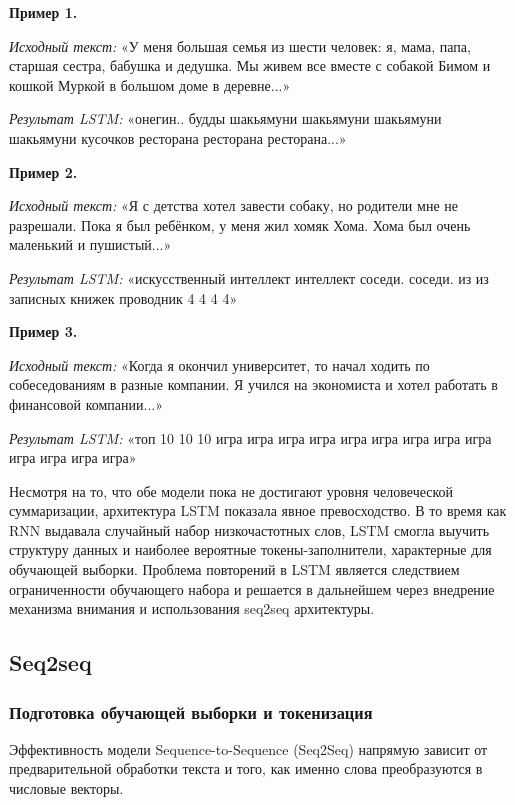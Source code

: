 \documentclass[coursework]{SCWorks}
\begin{document}
    \textbf{Пример 1.}

    \textit{Исходный текст:} «У меня большая семья из шести человек: я, мама, папа, старшая сестра, бабушка и дедушка. Мы живем все вместе с собакой Бимом и кошкой Муркой в большом доме в деревне...»

    \textit{Результат LSTM:} «онегин.. будды шакьямуни шакьямуни шакьямуни шакьямуни кусочков ресторана ресторана ресторана...»

    \textbf{Пример 2.}

    \textit{Исходный текст:} «Я с детства хотел завести собаку, но родители мне не разрешали. Пока я был ребёнком, у меня жил хомяк Хома. Хома был очень маленький и пушистый...»

    \textit{Результат LSTM:} «искусственный интеллект интеллект соседи. соседи. из из записных книжек проводник 4 4 4 4»

    \textbf{Пример 3.}

    \textit{Исходный текст:} «Когда я окончил университет, то начал ходить по собеседованиям в разные компании. Я учился на экономиста и хотел работать в финансовой компании...»

    \textit{Результат LSTM:} «топ 10 10 10 игра игра игра игра игра игра игра игра игра игра игра игра игра»

    Несмотря на то, что обе модели пока не достигают уровня человеческой суммаризации,
    архитектура LSTM показала явное превосходство.
    В то время как RNN выдавала случайный набор низкочастотных слов,
    LSTM смогла выучить структуру данных и наиболее вероятные токены-заполнители, характерные для обучающей выборки.
    Проблема повторений в LSTM является следствием ограниченности обучающего набора и
    решается в дальнейшем через внедрение механизма внимания и использования seq2seq архитектуры.

    \subsection{Seq2seq}

    \subsubsection{Подготовка обучающей выборки и токенизация}

    Эффективность модели Sequence-to-Sequence (Seq2Seq) напрямую зависит от предварительной обработки текста и того,
    как именно слова преобразуются в числовые векторы.
\end{document}

